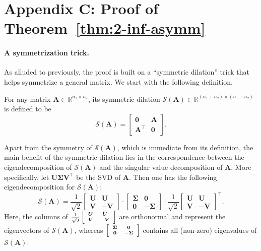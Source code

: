 \section{Appendix C: Proof of Theorem~\ref{thm:2-inf-asymm}}
\label{sec:proof-inf-rect}

\paragraph{A symmetrization trick. }

As alluded to previously, the proof is built  on a ``symmetric dilation'' trick that helps symmetrize a general matrix. We start with the following definition.  

\begin{definition}
\label{defn:sym-dilation}
For any matrix $\bm{A}\in\mathbb{R}^{n_{1}\times n_{2}}$, its symmetric dilation $\mathcal{S}(\bm{A})\in\mathbb{R}^{(n_{1}+n_{2})\times(n_{1}+n_{2})}$ is defined to be 
%
\[
\mathcal{S}(\bm{A})=\left[\begin{array}{cc}
\bm{0} & \bm{A}\\
\bm{A}^{\top} & \bm{0}
\end{array}\right].
\]
%
 \end{definition}
Apart from the symmetry of $\mathcal{S}(\bm{A})$,
which is immediate from its definition, the main benefit of the symmetric
dilation lies in the correspondence between the eigendecomposition
of $\mathcal{S}(\bm{A})$ and the singular value decomposition of
$\bm{A}$. More specifically, let $\bm{U}\bm{\Sigma}\bm{V}^{\top}$
be the SVD of $\bm{A}$. Then one has the following eigendecomposition
for $\mathcal{S}(\bm{A})$: 
\begin{equation}
\mathcal{S}(\bm{A})=\frac{1}{\sqrt{2}}\left[\begin{array}{cc}
\bm{U} & \bm{U}\\
\bm{V} & -\bm{V}
\end{array}\right]\cdot\left[\begin{array}{cc}
\bm{\Sigma} & \bm{0}\\
\bm{0} & -\bm{\Sigma}
\end{array}\right]\cdot\frac{1}{\sqrt{2}}\left[\begin{array}{cc}
\bm{U} & \bm{U}\\
\bm{V} & -\bm{V}
\end{array}\right]^{\top}. \label{eq:dilation-eigen}
\end{equation}
%
Here, the columns of $\frac{1}{\sqrt{2}}\left[{\scriptsize \begin{array}{cc}
\bm{U} & \bm{U}\\
\bm{V} & -\bm{V}
\end{array}}\right]$
%
are orthonormal and represent the eigenvectors of $\mathcal{S}(\bm{A})$, whereas
$\left[{\scriptsize \begin{array}{cc}
\bm{\Sigma} & \bm{0}\\
\bm{0} & -\bm{\Sigma}
\end{array}}\right]$ contains all (non-zero) eigenvalues
of $\mathcal{S}(\bm{A})$. 

